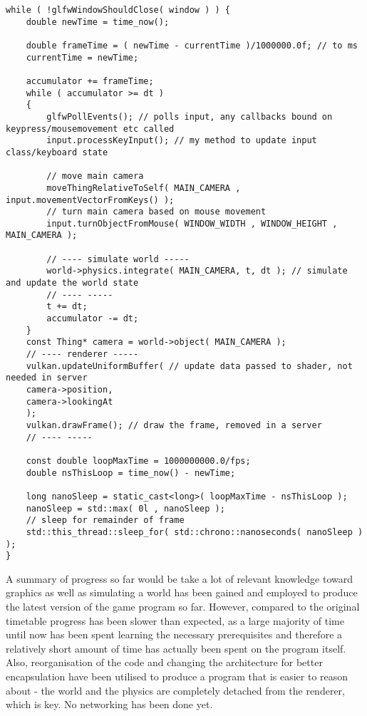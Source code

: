 \documentclass[titlepage]{article}
\begin{document}
\begin{lstlisting}[caption={The main loop of the game, note the separate renderer and world simulation parts}, label=mainLoop, frame=tb]
while ( !glfwWindowShouldClose( window ) ) {
	double newTime = time_now();

	double frameTime = ( newTime - currentTime )/1000000.0f; // to ms
	currentTime = newTime;

	accumulator += frameTime;
	while ( accumulator >= dt )
	{
		glfwPollEvents(); // polls input, any callbacks bound on keypress/mousemovement etc called
		input.processKeyInput(); // my method to update input class/keyboard state

		// move main camera
		moveThingRelativeToSelf( MAIN_CAMERA , input.movementVectorFromKeys() );
		// turn main camera based on mouse movement
		input.turnObjectFromMouse( WINDOW_WIDTH , WINDOW_HEIGHT , MAIN_CAMERA );

		// ---- simulate world -----
		world->physics.integrate( MAIN_CAMERA, t, dt ); // simulate and update the world state
		// ---- -----
		t += dt;
		accumulator -= dt;
	}
	const Thing* camera = world->object( MAIN_CAMERA );
	// ---- renderer -----
	vulkan.updateUniformBuffer( // update data passed to shader, not needed in server
	camera->position,
	camera->lookingAt
	);
	vulkan.drawFrame(); // draw the frame, removed in a server
	// ---- -----

	const double loopMaxTime = 1000000000.0/fps;
	double nsThisLoop = time_now() - newTime;

	long nanoSleep = static_cast<long>( loopMaxTime - nsThisLoop );
	nanoSleep = std::max( 0l , nanoSleep );
	// sleep for remainder of frame
	std::this_thread::sleep_for( std::chrono::nanoseconds( nanoSleep ) );
}
\end{lstlisting}

\linespread{1.16125}
	A summary of progress so far would be take a lot of relevant knowledge toward graphics as well as simulating a world has been gained and employed to produce the latest version of the game program so far. However, compared to the original timetable progress has been slower than expected, as a large majority of time until now has been spent learning the necessary prerequisites and therefore a relatively short amount of time has actually been spent on the program itself. Also, reorganisation of the code and changing the architecture for better encapsulation have been utilised to produce a program that is easier to reason about - the world and the physics are completely detached from the renderer, which is key. No networking has been done yet.
\end{document}
